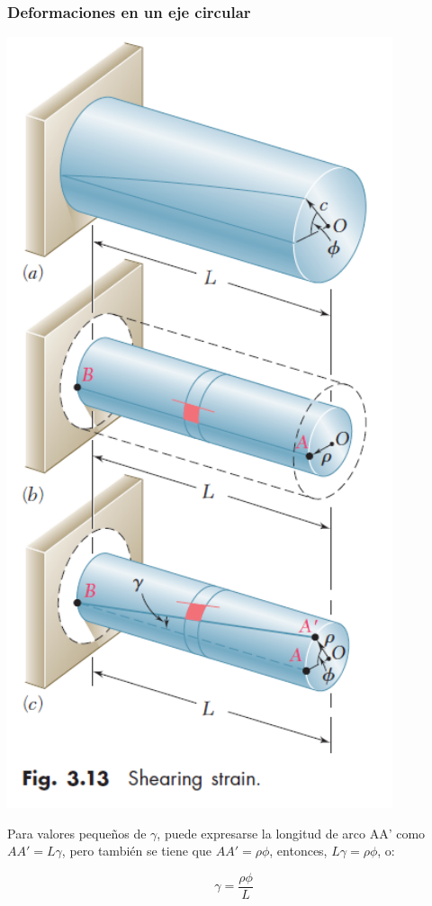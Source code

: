 \documentclass{beamer}
\begin{document}
\begin{frame}
\justifying
\frametitle{Deformaciones en un eje circular}


\begin{minipage}{\linewidth}
  \centering
  \begin{minipage}{0.45\textwidth}
  \includegraphics[width=0.85\textwidth]{img/shearing_strain.PNG}
  \end{minipage}
  \hspace{0.05\linewidth}
  \begin{minipage}{0.45\linewidth}
  Para valores pequeños de $\gamma$, puede expresarse la longitud de arco AA' como $AA' = L\gamma $, pero también 
  se tiene que $AA' = \rho \phi$, entonces, $L\gamma = \rho\phi$, o:

  $$ \gamma =\frac{\rho\phi}{L} $$
  \end{minipage}
\end{minipage}

\end{frame}
\end{document}

